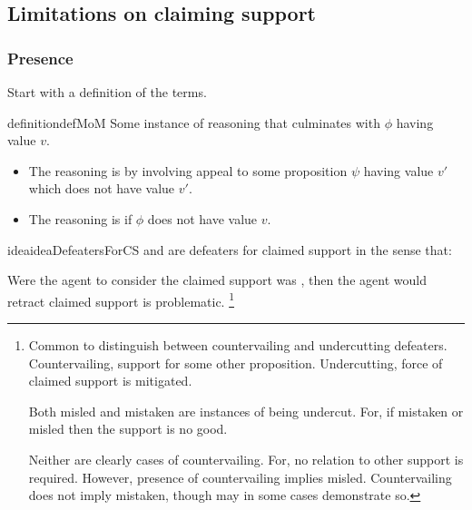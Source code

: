 \subsection{Limitations on claiming support}
\label{sec:claimed-support-1}

\subsubsection{Presence}
\label{sec:presence}

\begin{note}
  \color{red}
  Start with a definition of the terms.
\end{note}

\begin{note}
  \begin{restatable}{definition}{defMoM}\label{def:MoM}
    Some instance of reasoning that culminates with \(\phi\) having value \(v\).
    \begin{itemize}
      \item The reasoning is \emph{\mistaken{}} by involving appeal to some proposition \(\psi\) having value \(v'\) which does not have value \(v'\).
    \item The reasoning is \emph{\misled{}} if \(\phi\) does not have value \(v\).
    \end{itemize}
    \vspace{-\baselineskip}
  \end{restatable}
\end{note}

\begin{note}
  \begin{restatable}[\twodefeaters{-} --- \twodefeaters{}]{idea}{ideaDefeatersForCS}\label{idea:defs-for-CS}
    \mistaken{-} and \misled{} are defeaters for claimed support in the sense that:

    Were the agent to consider the claimed support was \mom{}, then the agent would retract claimed support is problematic.\nolinebreak
    \footnote{
      Common to distinguish between countervailing and undercutting defeaters.
      Countervailing, support for some other proposition.
      Undercutting, force of claimed support is mitigated.

      Both misled and mistaken are instances of being undercut.
      For, if mistaken or misled then the support is no good.

      Neither are clearly cases of countervailing.
      For, no relation to other support is required.
      However, presence of countervailing implies misled.
      Countervailing does not imply mistaken, though may in some cases demonstrate so.
    }
  \end{restatable}
\end{note}

